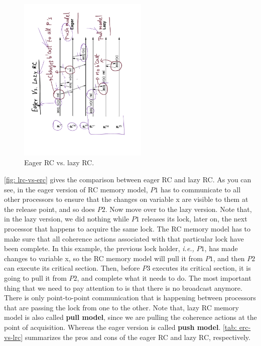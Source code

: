 \documentclass[11pt]{lecture}
\def\fullsize{0.55\textwidth}
\begin{document}
\begin{figure}[!htbp]
\centering
\includegraphics[width=\fullsize,angle=-90]{Figures/ERCvsLRC}
\caption{Eager RC vs. lazy RC.}\label{fig: lrc-vs-erc}
\end{figure}

\autoref{fig: lrc-vs-erc} gives the comparison between eager RC and lazy RC. As you can see, in the eager 
version of RC memory model, $P1$ has to communicate to all other processors to ensure that the 
changes on variable {\code x} are visible to them at the release point, and so does $P2$. Now move over to 
the lazy version. Note that, in the lazy version, we did nothing while $P1$ releases its lock, later on, 
the next processor that happens to acquire the same lock. The RC memory model 
has to make sure that all coherence actions associated with that particular lock have been complete. In this example, 
the previous lock holder, {\it i.e.,} $P1$, has made changes to variable {\code x}, so the RC memory model 
will pull it from $P1$, and then $P2$ can execute its critical section. Then, before $P3$ executes its critical 
section, it is going to pull it from $P2$, and complete what it needs to do. The most important thing 
that we need to pay attention to is that there is no broadcast anymore. There is only point-to-point 
communication that is happening between processors that are passing the lock from one to the other. Note that, 
lazy RC memory model is also called {\bf pull model}, since we are pulling the coherence actions at the point of acquisition. 
Whereas the eager version is called {\bf push model}. \autoref{tab: erc-vs-lrc} summarizes the pros and 
cons of the eager RC and lazy RC, respectively. 
\end{document}
